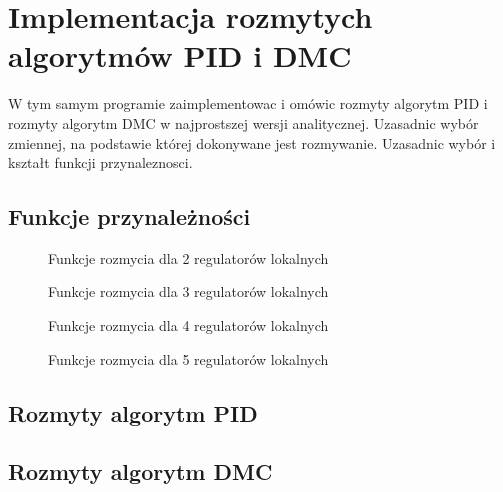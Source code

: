 \section{Implementacja rozmytych algorytmów PID i DMC}
\label{projekt:zad5}


W tym samym programie zaimplementowac i omówic rozmyty algorytm PID i rozmyty
algorytm DMC w najprostszej wersji analitycznej. Uzasadnic wybór zmiennej,
na podstawie której dokonywane jest rozmywanie. Uzasadnic wybór i kształt funkcji
przynaleznosci.

%    


\subsection{Funkcje przynależności}
\label{projekt:zad5:fuzzyFunctions}

\begin{figure}[H] 
    \centering
    
    \caption{Funkcje rozmycia dla 2 regulatorów lokalnych}
    \label{lab:zad4:fuzzyFunction:2:figure}
\end{figure}

\begin{figure}[H] 
    \centering
    
    \caption{Funkcje rozmycia dla 3 regulatorów lokalnych}
    \label{lab:zad4:fuzzyFunction:3:figure}
\end{figure}

\begin{figure}[H] 
    \centering
    
    \caption{Funkcje rozmycia dla 4 regulatorów lokalnych}
    \label{lab:zad4:fuzzyFunction:4:figure}
\end{figure}

\begin{figure}[H] 
    \centering
    
    \caption{Funkcje rozmycia dla 5 regulatorów lokalnych}
    \label{lab:zad4:fuzzyFunction:5:figure}
\end{figure}

\newpage

\subsection{Rozmyty algorytm PID}
\label{projekt:zad5:PID}



\newpage

\subsection{Rozmyty algorytm DMC}
\label{projekt:zad5:DMC}



\newpage
